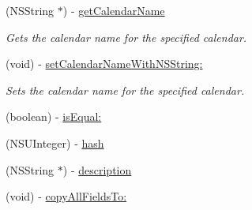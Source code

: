 \begin{DoxyCompactItemize}
(N\+S\+String $\ast$) -\/ \hyperlink{interface_calendar_details_a802b1ae31f9b3b1afe6500ccea8a1546}{get\+Calendar\+Name}
\begin{DoxyCompactList}\small\item\em Gets the calendar name for the specified calendar. \end{DoxyCompactList}\item 
(void) -\/ \hyperlink{interface_calendar_details_a07cc94c2f09a253a548d6705b1056ab4}{set\+Calendar\+Name\+With\+N\+S\+String\+:}
\begin{DoxyCompactList}\small\item\em Sets the calendar name for the specified calendar. \end{DoxyCompactList}\item 
(boolean) -\/ \hyperlink{interface_calendar_details_a36be06bdf77767d15580d1d2480e074f}{is\+Equal\+:}
\item 
(N\+S\+U\+Integer) -\/ \hyperlink{interface_calendar_details_a4d06e0519bc371edbef20a832fa605d2}{hash}
\item 
(N\+S\+String $\ast$) -\/ \hyperlink{interface_calendar_details_a0550f2d1e712be6d6ee586c3bacb7e48}{description}
\item 
(void) -\/ \hyperlink{interface_calendar_details_aa8aa74d6bd095c8481c892347288156f}{copy\+All\+Fields\+To\+:}
\end{DoxyCompactItemize}
